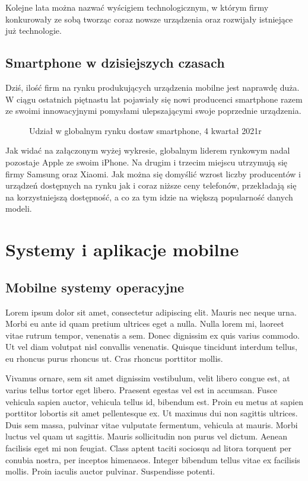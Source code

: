 \documentclass[a4paper,12pt,oneside]{book}
\begin{document}
	Kolejne lata można nazwać wyścigiem technologicznym, w którym firmy konkurowały ze sobą tworząc coraz nowsze urządzenia oraz rozwijały istniejące już technologie.
	
	\section{Smartphone w dzisiejszych czasach}
	Dziś, ilość firm na rynku produkujących urządzenia mobilne jest naprawdę duża. W ciągu ostatnich piętnastu lat pojawiały się nowi producenci smartphone razem ze swoimi innowacyjnymi pomysłami ulepszającymi swoje poprzednie urządzenia. 
	
	\begin{figure}[h]
		\centering
		\caption{Udział w globalnym rynku dostaw smartphone, 4 kwartał 2021r}
	\end{figure}
	
	Jak widać na załączonym wyżej wykresie, globalnym liderem rynkowym nadal pozostaje Apple ze swoim iPhone. Na drugim i trzecim miejscu utrzymują się firmy Samsung oraz Xiaomi. Jak można się domyślić wzrost liczby producentów i urządzeń dostępnych na rynku jak i coraz niższe ceny telefonów, przekładają się na korzystniejszą dostępność, a co za tym idzie na większą popularność danych modeli. 
	
	\newpage
	\thispagestyle{empty}
	\chapter{Systemy i aplikacje mobilne}
	\section{Mobilne systemy operacyjne}
	Lorem ipsum dolor sit amet, consectetur adipiscing elit. Mauris nec neque urna. Morbi eu ante id quam pretium ultrices eget a nulla. Nulla lorem mi, laoreet vitae rutrum tempor, venenatis a sem. Donec dignissim ex quis varius commodo. Ut vel diam volutpat nisl convallis venenatis. Quisque tincidunt interdum tellus, eu rhoncus purus rhoncus ut. Cras rhoncus porttitor mollis.
	
	Vivamus ornare, sem sit amet dignissim vestibulum, velit libero congue est, at varius tellus tortor eget libero. Praesent egestas vel est in accumsan. Fusce vehicula sapien auctor, vehicula tellus id, bibendum est. Proin eu metus at sapien porttitor lobortis sit amet pellentesque ex. Ut maximus dui non sagittis ultrices. Duis sem massa, pulvinar vitae vulputate fermentum, vehicula at mauris. Morbi luctus vel quam ut sagittis. Mauris sollicitudin non purus vel dictum. Aenean facilisis eget mi non feugiat. Class aptent taciti sociosqu ad litora torquent per conubia nostra, per inceptos himenaeos. Integer bibendum tellus vitae ex facilisis mollis. Proin iaculis auctor pulvinar. Suspendisse potenti.
	
\end{document}
